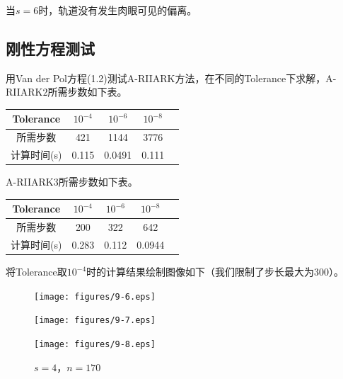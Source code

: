 \documentclass[lang=cn,10pt,bibend=bibtex]{elegantbook}
\begin{document}
当$s=6$时，轨道没有发生肉眼可见的偏离。

\vspace{-.5em}
\subsection{刚性方程测试}

用Van der Pol方程(1.2)测试A-RIIARK方法，在不同的Tolerance下求解，A-RIIARK$2$所需步数如下表。

\vspace{-.5em}
\begin{table}[H]
  \centering
  \begin{tabular}{c|cccc}
    Tolerance & $10^{-4}$ & $10^{-6}$ & $10^{-8}$ \\ \hline
    所需步数 & 421 & 1144 & 3776   \\
    计算时间(s) & 0.115  & 0.0491  & 0.111  
  \end{tabular}
\end{table}
\vspace{-.5em}

A-RIIARK$3$所需步数如下表。

\vspace{-.5em}
\begin{table}[H]
  \centering
  \begin{tabular}{c|cccc}
    Tolerance & $10^{-4}$ & $10^{-6}$ & $10^{-8}$ \\ \hline
    所需步数 & 200 & 322 & 642   \\
    计算时间(s) & 0.283  & 0.112  & 0.0944  
  \end{tabular}
\end{table}
\vspace{-.5em}

将Tolerance取$10^{-4}$时的计算结果绘制图像如下（我们限制了步长最大为300）。

\vspace{-.5em}
\begin{figure}[H]
  \centering
  \begin{minipage}[t]{0.32\linewidth}
      \centering
      \texttt{[image: figures/9-6.eps]}
      \caption*{\small $s=2$，$n=421$}
  \end{minipage}
  \hspace{.31em}
  \begin{minipage}[t]{0.32\linewidth}
      \centering
      \texttt{[image: figures/9-7.eps]}
      \caption*{\small $s=3$，$n=200$}
  \end{minipage}
  \hspace{.31em}
  \begin{minipage}[t]{0.32\linewidth}
      \centering
      \texttt{[image: figures/9-8.eps]}
      \caption*{\small $s=4$，$n=170$}
  \end{minipage}
\end{figure}
\vspace{-.5em}
\end{document}
